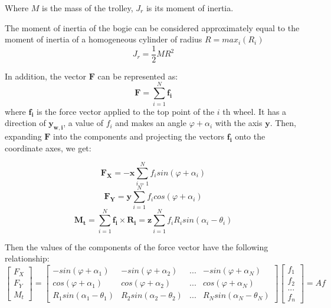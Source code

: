 \documentclass[oneside,final,14pt]{extreport}
\newcommand{\bs}{\boldsymbol}
\begin{document}
Where $ M $ is the mass of the trolley, $ J_{r} $ is its moment of inertia.

\begin{figure} [H]
\end{figure}
The moment of inertia of the bogie can be considered approximately equal to the moment of inertia of a homogeneous cylinder of radius $ R = max_{i} (R_{i}) $
\begin{equation}
J_{r}
=
\frac{1}{2}
MR ^{2}
\end{equation}


In addition, the vector $ \bs{F} $ can be represented as:
\begin{equation}
\bs{F}
=
\sum_{i = 1} ^{N} \bs{f_{i}}
\end{equation}
where $ \bs{f_{i}} $ is the force vector applied to the top point of the $ i $ th wheel. It has a direction of $ \bs{y_{w, i}} $, a value of $ f_{i} $ and makes an angle $ \varphi + \alpha_{i} $ with the axis $ \bs{y} $.
Then, expanding $ \bs{F} $ into the components and projecting the vectors $ \bs{f_{i}} $ onto the coordinate axes, we get:

\begin{equation}
\bs{F_{X}}
=
-
\bs{x}
\sum_{i = 1} ^{N} f_{i} sin (\varphi + \alpha_{i})
\end{equation}
\begin{equation}
\bs{F_{Y}}
=
\bs{y}
\sum_{i = 1} ^{N} f_{i} cos (\varphi + \alpha_{i})
\end{equation}
\begin{equation}
\label{eq: rot_force}
\bs{M_{t}}
=
\sum_{i = 1} ^{N} \bs{f_{i}} \times \bs{R_{i}}
=
\bs{z}
\sum_{i = 1} ^{N} f_{i} R_{i} sin (\alpha_{i} - \theta_{i})
\end{equation}



Then the values ​​of the components of the force vector have the following relationship:
\begin{equation}
\begin{bmatrix}
F_{X} \\
F_{Y} \\
M_{t}
\end{bmatrix}
=
\begin{bmatrix}
-sin (\varphi + \alpha_{1}) &
-sin (\varphi + \alpha_{2}) &
... &
-sin (\varphi + \alpha_{N}) \\
cos (\varphi + \alpha_{1}) &
cos (\varphi + \alpha_{2}) &
... &
cos (\varphi + \alpha_{N}) \\
R_{1} sin (\alpha_{1} - \theta_{1}) &
R_{2} sin (\alpha_{2} - \theta_{2}) &
 ... &
R_{N} sin (\alpha_{N} - \theta_{N})
\end{bmatrix}
\begin{bmatrix}
f_{1} \\
f_{2} \\
... \\
f_{n}
\end{bmatrix}
=
Af
\end{equation}
\end{document}

